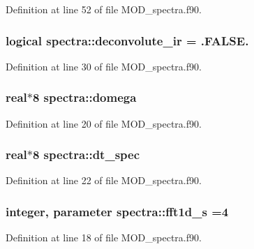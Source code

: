 Definition at line 52 of file M\-O\-D\-\_\-spectra.\-f90.

\hypertarget{classspectra_a2a068eb1a4906b0bc46cc04329cd5963}{
\subsubsection[{deconvolute\-\_\-ir}]{\setlength{\rightskip}{0pt plus 5cm}logical spectra\-::deconvolute\-\_\-ir = .F\-A\-L\-S\-E.}}\label{classspectra_a2a068eb1a4906b0bc46cc04329cd5963}


Definition at line 30 of file M\-O\-D\-\_\-spectra.\-f90.

\hypertarget{classspectra_a0e698cb9fa5f3ddcccaf55304c393c33}{
\subsubsection[{domega}]{\setlength{\rightskip}{0pt plus 5cm}real$\ast$8 spectra\-::domega}}\label{classspectra_a0e698cb9fa5f3ddcccaf55304c393c33}


Definition at line 20 of file M\-O\-D\-\_\-spectra.\-f90.

\hypertarget{classspectra_aca97470f841ed23ff62294903133449f}{
\subsubsection[{dt\-\_\-spec}]{\setlength{\rightskip}{0pt plus 5cm}real$\ast$8 spectra\-::dt\-\_\-spec}}\label{classspectra_aca97470f841ed23ff62294903133449f}


Definition at line 22 of file M\-O\-D\-\_\-spectra.\-f90.

\hypertarget{classspectra_ac089e26587f369f12bc46f1c90f87f3a}{
\subsubsection[{fft1d\-\_\-s}]{\setlength{\rightskip}{0pt plus 5cm}integer, parameter spectra\-::fft1d\-\_\-s =4}}\label{classspectra_ac089e26587f369f12bc46f1c90f87f3a}


Definition at line 18 of file M\-O\-D\-\_\-spectra.\-f90.

